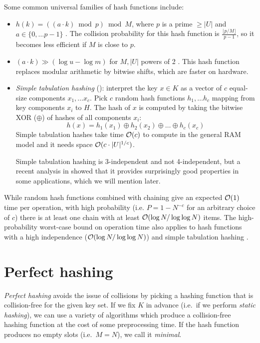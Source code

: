 Some common universal families of hash functions include:
\begin{itemize}
\item $h(k)=((a\cdot k)\bmod p)\bmod M$, where $p$ is a prime $\geq |U|$
	and $a\in\{0,\ldots p-1\}$ \cite{univ-classes}.
	The collision probability for this hash function is
	$\frac{\lfloor p/M\rfloor}{p-1}$, so it becomes less efficient
	if $M$ is close to $p$.
\item $(a\cdot k)\gg(\log u-\log m)$ for $M, |U|$ powers of 2
	\cite{dietzfelbinger}.
	This hash function replaces modular arithmetic by bitwise shifts,
	which are faster on hardware.
\item \emph{Simple tabulation hashing} (\cite{univ-classes}):
	interpret the key $x\in K$ as a vector
	of $c$ equal-size components $x_1,\ldots x_c$. Pick $c$ random hash
	functions $h_1,\ldots h_c$ mapping from key components $x_i$ to $H$.
	The hash of $x$ is computed by taking the bitwise XOR ($\oplus$)
	of hashes of all components $x_i$:
	$$h(x)=h_1(x_1)\oplus h_2(x_2)\oplus \ldots \oplus h_c(x_c)$$
	Simple tabulation hashes take time $\mathcal{O}(c)$ to compute in the general RAM
	model and it needs space $\mathcal{O}(c\cdot |U|^{1/c})$.  %

	Simple tabulation hashing is 3-independent and not 4-independent,
	but a recent analysis in \cite{power-of-simple-tab} showed that
	it provides surprisingly good properties in some applications,
	which we will mention later.
\end{itemize}

While random hash functions combined with chaining give an expected $\mathcal{O}(1)$
time per operation, with high probability (i.e.  $P=1-N^{-c}$ for an arbitrary
choice of $c$) there is at least one chain with at least $\mathcal{O}(\log N/\log\log N)$
items. The high-probability worst-case bound on operation time also applies
to hash functions with a high independence ($\mathcal{O}(\log N/\log\log N)$)
\cite{chernoff-hoeffding-bounds} and simple tabulation
hashing \cite{power-of-simple-tab}.

\section{Perfect hashing}
\emph{Perfect hashing} avoids the issue of collisions by picking a hashing
function that is collision-free for the given key set. If we fix $K$
in advance (i.e.\ if we perform \emph{static hashing}), we can use a variety
of algorithms which produce a collision-free hashing function at the cost
of some preprocessing time. If the hash function produces no empty slots
(i.e.\ $M=N$), we call it \emph{minimal}.

